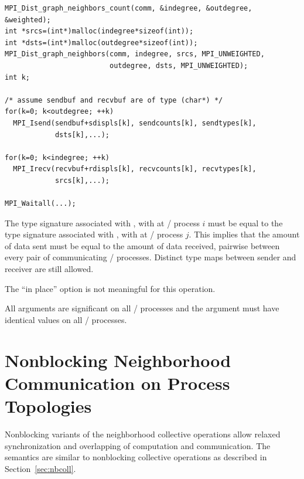 \begin{lstlisting}[language={[MPI]C}]
MPI_Dist_graph_neighbors_count(comm, &indegree, &outdegree, &weighted);
int *srcs=(int*)malloc(indegree*sizeof(int));
int *dsts=(int*)malloc(outdegree*sizeof(int));
MPI_Dist_graph_neighbors(comm, indegree, srcs, MPI_UNWEIGHTED,
                         outdegree, dsts, MPI_UNWEIGHTED);
int k;

/* assume sendbuf and recvbuf are of type (char*) */
for(k=0; k<outdegree; ++k)
  MPI_Isend(sendbuf+sdispls[k], sendcounts[k], sendtypes[k],
            dsts[k],...);

for(k=0; k<indegree; ++k)
  MPI_Irecv(recvbuf+rdispls[k], recvcounts[k], recvtypes[k],
            srcs[k],...);

MPI_Waitall(...);
\end{lstlisting}

The type signature associated with
\mpicode{[k]}, \mpicode{[k]}
with  at \MPI/ process $i$
must be equal to the type signature associated with
\mpicode{[l]}, \mpicode{[l]}
with  at \MPI/ process $j$.
This implies that the amount of data sent must be equal to the
amount of data received, pairwise between every pair of
communicating \MPI/ processes.
Distinct type maps between sender and receiver are still allowed.
 
The ``in place'' option is not meaningful for this operation.

All arguments are significant on all \MPI/ processes and the argument
 must have identical values on all \MPI/ processes.



\section[Nonblocking Neighborhood Communication]{Nonblocking Neighborhood Communication on Process Topologies}
\label{sec:sparsecoll-nbc}

Nonblocking variants of the neighborhood collective operations allow
relaxed synchronization and
overlapping of computation and communication.
The semantics are similar to nonblocking collective
operations as described in Section~\ref{sec:nbcoll}. 

